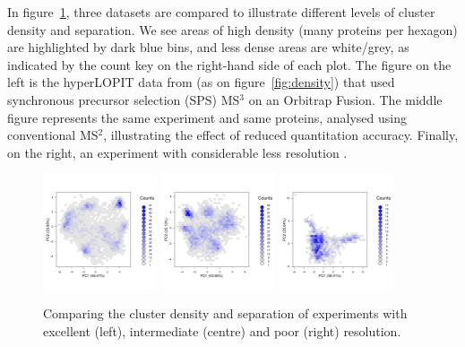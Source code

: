 \documentclass[12pt]{article}\usepackage[]{graphicx}\usepackage[]{color}
\begin{document}
In figure~\ref{fig:hexbin1}, three datasets are compared to illustrate
different levels of cluster density and separation. We see areas of
high density (many proteins per hexagon) are highlighted by dark blue
bins, and less dense areas are white/grey, as indicated by the count
key on the right-hand side of each plot. The figure on the left is the
hyperLOPIT data from \citet{Christoforou:2016} (as on
figure~\ref{fig:density}) that used synchronous precursor selection
(SPS) MS$^3$ on an Orbitrap Fusion. The middle figure represents the
same experiment and same proteins, analysed using conventional MS$^2$,
illustrating the effect of reduced quantitation accuracy. Finally, on
the right, an experiment with considerable less resolution
\citep{Hall:2009}.

\begin{figure}[ht]
  \centering
  \includegraphics[width = 0.3\textwidth]{./figure/hexbin-1.pdf}
  \includegraphics[width = 0.3\textwidth]{./figure/hexbin-2.pdf}
  \includegraphics[width = 0.3\textwidth]{./figure/hexbin-3.pdf}
  \caption{Comparing the cluster density and separation of experiments
    with excellent (left), intermediate (centre) and poor (right)
    resolution.}
  \label{fig:hexbin1}
\end{figure}
\end{document}
